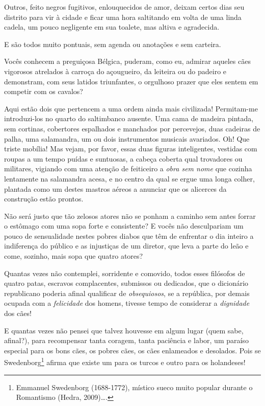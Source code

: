 Outros, feito negros fugitivos, enlouquecidos de amor, deixam certos
dias seu distrito para vir à cidade e ficar uma hora saltitando em volta de
uma linda cadela, um pouco negligente em sua toalete, mas
altiva e agradecida.

E são todos muito pontuais, sem agenda ou anotações e sem
carteira.

Vocês conhecem a preguiçosa Bélgica, puderam, como eu, admirar
aqueles cães vigorosos atrelados à carroça do açougueiro, da leiteira ou
do padeiro e demonstram, com seus latidos triunfantes, o orgulhoso prazer
que eles sentem em competir com os cavalos?

Aqui estão dois que pertencem a uma ordem ainda mais civilizada!
Permitam-me introduzi-los no quarto do saltimbanco ausente. Uma
cama de madeira pintada, sem cortinas, cobertores espalhados e
manchados por percevejos, duas cadeiras de palha, uma salamandra, um ou
dois instrumentos musicais avariados. Oh! Que triste mobília! Mas
vejam, por favor, essas duas figuras inteligentes, vestidas com roupas
a um tempo puídas e suntuosas, a cabeça coberta qual trovadores ou
militares, vigiando com uma atenção de feiticeiro a \textit{obra sem nome}
que cozinha lentamente na salamandra acesa, e no centro da qual
se ergue uma longa colher, plantada como um destes mastros aéreos a
anunciar que os alicerces da construção estão prontos.

Não será justo que tão zelosos atores não se ponham a caminho sem antes
forrar o estômago com uma sopa forte e consistente? E vocês não
desculpariam um pouco de sensualidade nestes pobres diabos que têm de
enfrentar o dia inteiro a indiferença do público e as injustiças de um
diretor, que leva a parte do leão e come, sozinho, mais sopa que
quatro atores?

Quantas vezes não contemplei, sorridente e comovido, todos esses
filósofos de quatro patas, escravos complacentes, submissos ou
dedicados, que o dicionário republicano poderia afinal qualificar de
\textit{obsequiosos}, se a república, por demais ocupada com a \textit{felicidade} dos
homens, tivesse tempo de considerar a \textit{dignidade} dos cães!

E quantas vezes não pensei que talvez houvesse em algum lugar (quem
sabe, afinal?), para recompensar tanta coragem, tanta paciência e
labor, um paraíso especial para os bons cães, os pobres cães, os cães
enlameados e desolados. Pois se Swedenborg\protect\footnote{ Emmanuel 
Swedenborg (1688-1772), místico sueco muito popular durante o Romantismo (Hedra, 2009)\ldots.}
afirma que existe um para os turcos e outro para os holandeses!

